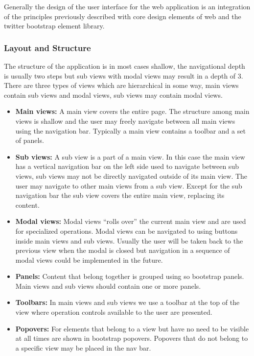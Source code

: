 Generally the design of the user interface for the web application is an integration of the principles previously described with core design elements of web and the twitter bootstrap element library.

\subsubsection{Layout and Structure}
The structure of the application is in most cases shallow, the navigational depth is usually two steps but sub views with modal views may result in a depth of 3. There are three types of views which are hierarchical in some way, main views contain sub views and modal views, sub views may contain modal views.
\begin{itemize}
	\item \textbf{Main views:}
A main view covers the entire page. The structure among main views is shallow and the user may freely navigate between all main views using the navigation bar. Typically a main view contains a toolbar and a set of panels.
	\item \textbf{Sub views:}
A sub view is a part of a main view. In this case the main view has a vertical navigation bar on the left side used to navigate between sub views, sub views may not be directly navigated outside of its main view. The user may navigate to other main views from a sub view. Except for the sub navigation bar the sub view covers the entire main view, replacing its content.
	\item \textbf{Modal views:}
Modal views “rolls over” the current main view and are used for specialized operations. Modal views can be navigated to using buttons inside main views and sub views. Usually the user will be taken back to the previous view when the modal is closed but navigation in a sequence of modal views could be implemented in the future.
    \item \textbf{Panels:}
Content that belong together is grouped using so bootstrap panels. Main views and sub views should contain one or more panels.
    
    \item \textbf{Toolbars:}
In main views and sub views we use a toolbar at the top of the view where operation controls available to the user are presented.
    
    \item \textbf{Popovers:}
For elements that belong to a view but have no need to be visible at all times are shown in bootstrap popovers. Popovers that do not belong to a specific view may be placed in the nav bar.
    
\end{itemize}

